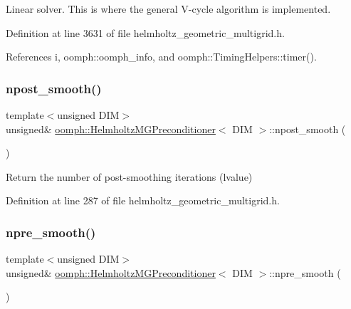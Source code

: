 Linear solver. This is where the general V-\/cycle algorithm is implemented. 

Definition at line 3631 of file helmholtz\+\_\+geometric\+\_\+multigrid.\+h.



References i, oomph\+::oomph\+\_\+info, and oomph\+::\+Timing\+Helpers\+::timer().

\mbox{\label{classoomph_1_1HelmholtzMGPreconditioner_aba2f9f9f2b973db3863a4c3c34c63625}} 
\subsubsection{\texorpdfstring{npost\+\_\+smooth()}{npost\_smooth()}}
{\footnotesize\ttfamily template$<$unsigned D\+IM$>$ \\
unsigned\& \hyperlink{classoomph_1_1HelmholtzMGPreconditioner}{oomph\+::\+Helmholtz\+M\+G\+Preconditioner}$<$ D\+IM $>$\+::npost\+\_\+smooth (\begin{DoxyParamCaption}{ }\end{DoxyParamCaption})\hspace{0.3cm}{\ttfamily [inline]}}



Return the number of post-\/smoothing iterations (lvalue) 



Definition at line 287 of file helmholtz\+\_\+geometric\+\_\+multigrid.\+h.

\mbox{\label{classoomph_1_1HelmholtzMGPreconditioner_aac39db0b4c814ddb7b7137927477b7d2}} 
\subsubsection{\texorpdfstring{npre\+\_\+smooth()}{npre\_smooth()}}
{\footnotesize\ttfamily template$<$unsigned D\+IM$>$ \\
unsigned\& \hyperlink{classoomph_1_1HelmholtzMGPreconditioner}{oomph\+::\+Helmholtz\+M\+G\+Preconditioner}$<$ D\+IM $>$\+::npre\+\_\+smooth (\begin{DoxyParamCaption}{ }\end{DoxyParamCaption})\hspace{0.3cm}{\ttfamily [inline]}}



